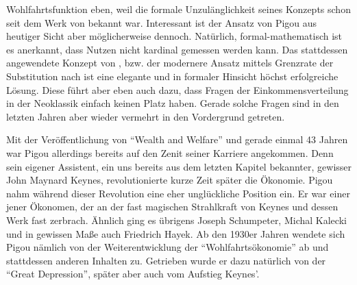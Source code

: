 Wohlfahrtsfunktion eben, weil die formale Unzulänglichkeit seines Konzepts schon seit dem Werk von \textcite{Pareto1906} bekannt war. Interessant ist der Ansatz von Pigou aus heutiger Sicht aber möglicherweise dennoch. Natürlich, formal-mathematisch ist es anerkannt, dass Nutzen nicht kardinal gemessen werden kann. Das stattdessen angewendete  Konzept von \textcite{Pareto1906}, bzw. der modernere Ansatz mittels Grenzrate der Substitution nach \textcite{Hicks1934b} ist eine elegante und in formaler Hinsicht höchst erfolgreiche Lösung. Diese führt aber eben auch dazu, dass Fragen der Einkommensverteilung in der Neoklassik einfach keinen Platz haben. Gerade solche Fragen sind in den letzten Jahren aber wieder vermehrt in den Vordergrund getreten.

Mit der Veröffentlichung von "`Wealth and Welfare"' und gerade einmal 43 Jahren war Pigou allerdings bereits auf den Zenit seiner Karriere angekommen. Denn sein eigener Assistent, ein uns bereits aus dem letzten Kapitel bekannter, gewisser John Maynard Keynes, revolutionierte kurze Zeit später die Ökonomie. Pigou nahm während dieser Revolution eine eher unglückliche Position ein. Er war einer jener Ökonomen, der an der fast magischen Strahlkraft von Keynes und dessen Werk fast zerbrach. Ähnlich ging es übrigens Joseph Schumpeter, Michal Kalecki und in gewissen Maße auch Friedrich Hayek. Ab den 1930er Jahren wendete sich Pigou nämlich von der Weiterentwicklung der "`Wohlfahrtsökonomie"' ab und stattdessen anderen Inhalten zu. Getrieben wurde er dazu natürlich von der "`Great Depression"', später aber auch vom Aufstieg Keynes'.  
